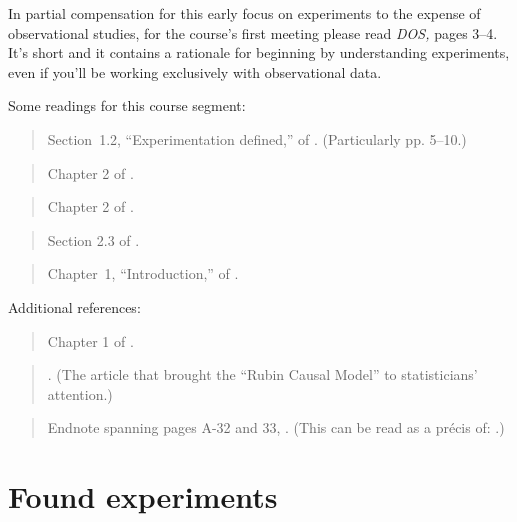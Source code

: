 \documentclass[12pt]{article}
\newcommand{\bibverse}[1]{\begin{verse} \bibentry{#1}. \end{verse}}
\begin{document}
In partial compensation for this early focus on experiments to the
expense of observational studies, for the course's
first meeting please read  \textit{DOS,}  pages 3--4.  It's short and it
contains a rationale for beginning by understanding experiments, even
if you'll be working exclusively with observational data. 

Some readings for this course segment:
\begin{verse} Section~1.2, ``Experimentation defined,''  of 
.  (Particularly pp. 5--10.) \end{verse}

\begin{verse}
  Chapter 2 of .
\end{verse}

\begin{verse}
  Chapter 2 of .
\end{verse}

\begin{verse}
  Section 2.3 of .
\end{verse}

\begin{verse} Chapter~1, ``Introduction,'' of .\end{verse}




Additional references:

\begin{verse}
  Chapter 1 of .
\end{verse}
\begin{verse}. (The article that brought the ``Rubin 
  Causal Model'' to  statisticians' attention.)\end{verse}

\begin{verse} Endnote spanning pages A-32 and 33,
  .  (This can be read as a pr{\'e}cis
  of: .)\end{verse}

\section{Found experiments}
\end{document}
